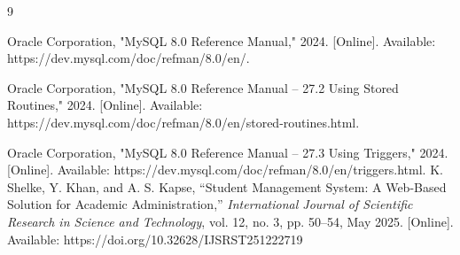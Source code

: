 \documentclass[12pt,a4paper]{report}
\begin{document}
    \begin{thebibliography}{9}

    Oracle Corporation, "MySQL 8.0 Reference Manual," 2024. [Online]. Available: https://dev.mysql.com/doc/refman/8.0/en/.

    Oracle Corporation, "MySQL 8.0 Reference Manual – 27.2 Using Stored Routines," 2024. [Online]. Available: https://dev.mysql.com/doc/refman/8.0/en/stored-routines.html. 

    Oracle Corporation, "MySQL 8.0 Reference Manual – 27.3 Using Triggers," 2024. [Online]. Available: https://dev.mysql.com/doc/refman/8.0/en/triggers.html.
    K. Shelke, Y. Khan, and A. S. Kapse, ``Student Management System: A Web-Based Solution for Academic Administration,'' \textit{International Journal of Scientific Research in Science and Technology}, vol. 12, no. 3, pp. 50--54, May 2025. [Online]. Available: https://doi.org/10.32628/IJSRST251222719

    \end{thebibliography}
\endgroup
\end{document}
